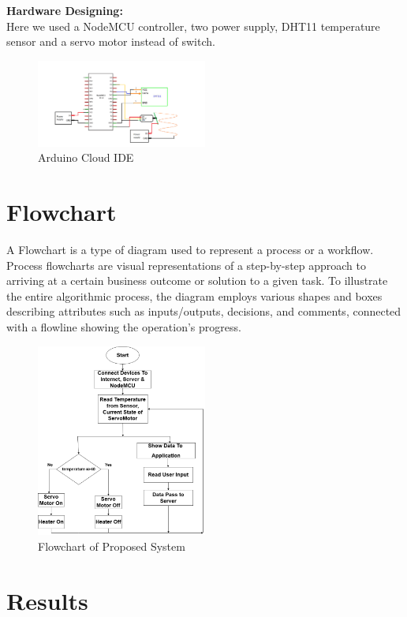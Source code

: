 \documentclass[conference]{IEEEtran}
\begin{document}
\textbf{Hardware Designing:\\}
Here we used a NodeMCU controller, two power supply, DHT11 temperature sensor and a servo motor instead of switch.
\begin{figure}[htbp]
\centerline{\includegraphics[width=0.5\textwidth]{Pin Diagram.png}}
\caption{Arduino Cloud IDE}
\label{fig}
\end{figure}


\section{Flowchart}
A Flowchart is a type of diagram used to represent a process or a workflow. Process flowcharts are visual representations of a step-by-step approach to arriving at a certain business outcome or solution to a given task. To illustrate the entire algorithmic process, the diagram employs various shapes and boxes describing attributes such as inputs/outputs, decisions, and comments, connected with a flowline showing the operation’s progress.

\begin{figure}[htbp]
\centerline{\includegraphics[width=0.5\textwidth]{Flow Chart.drawio (1).png}}
\caption{Flowchart of Proposed System}
\label{fig}
\end{figure}


\section{Results}
\end{document}
